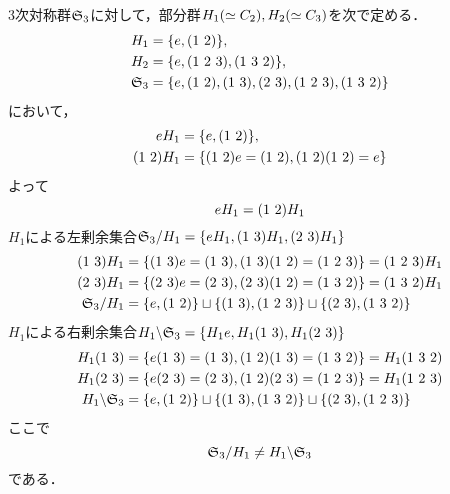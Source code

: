 \documentclass[main]{subfiles}
\begin{document}
			\begin{ex}
				3次対称群$\mathfrak{S}_3$に対して，部分群$H_1\qty(\simeq C_2), H_2\qty(\simeq C_3)$を次で定める．
				\begin{align*}
					H_1      & =\qty{e,\qty(1\ 2)},                                                       \\
					H_2      & =\qty{e, \qty(1\ 2\ 3), \qty(1\ 3\ 2)},                                    \\
					\frakS_3 & =\qty{e, \qty(1\ 2), \qty(1\ 3), \qty(2\ 3), \qty(1\ 2\ 3), \qty(1\ 3\ 2)}
				\end{align*}
				において，
				\begin{align*}
					eH_1          & =\qty{e, \qty(1\ 2)},                                \\
					\qty(1\ 2)H_1 & =\qty{\qty(1\ 2)e=\qty(1\ 2),\qty(1\ 2)\qty(1\ 2)=e}
				\end{align*}
				よって
				\[eH_1=\qty(1\ 2)H_1\]
				$H_1$による左剰余集合$\frakS_3/H_1=\qty{eH_1,\qty(1\ 3)H_1,\qty(2\ 3)H_1}$
				\begin{align*}
					\qty(1\ 3)H_1 & =\qty{\qty(1\ 3)e=\qty(1\ 3),\qty(1\ 3)\qty(1\ 2)=\qty(1\ 2\ 3)}=\qty(1\ 2\ 3)H_1            \\
					\qty(2\ 3)H_1 & =\qty{\qty(2\ 3)e=\qty(2\ 3),\qty(2\ 3)\qty(1\ 2)=\qty(1\ 3\ 2)}=\qty(1\ 3\ 2)H_1            \\
					\frakS_3/H_1  & =\qty{e,\qty(1\ 2)}\sqcup\qty{\qty(1\ 3), \qty(1\ 2\ 3)}\sqcup\qty{\qty(2\ 3),\qty(1\ 3\ 2)}
				\end{align*}
				$H_1$による右剰余集合$H_1\backslash\frakS_3=\qty{H_1e,H_1\qty(1\ 3),H_1\qty(2\ 3)}$
				\begin{align*}
					H_1\qty(1\ 3)         & =\qty{e\qty(1\ 3)=\qty(1\ 3),\qty(1\ 2)\qty(1\ 3)=\qty(1\ 3\ 2)}=H_1\qty(1\ 3\ 2)            \\
					H_1\qty(2\ 3)         & =\qty{e\qty(2\ 3)=\qty(2\ 3),\qty(1\ 2)\qty(2\ 3)=\qty(1\ 2\ 3)}=H_1\qty(1\ 2\ 3)            \\
					H_1\backslash\frakS_3 & =\qty{e, \qty(1\ 2)}\sqcup\qty{\qty(1\ 3),\qty(1\ 3\ 2)}\sqcup\qty{\qty(2\ 3),\qty(1\ 2\ 3)}
				\end{align*}
				{\color{red} ここで
				\[\mathfrak{S}_3/H_1\neq H_1\backslash\mathfrak{S}_3\]
				である．}


\end{ex}
\end{document}
